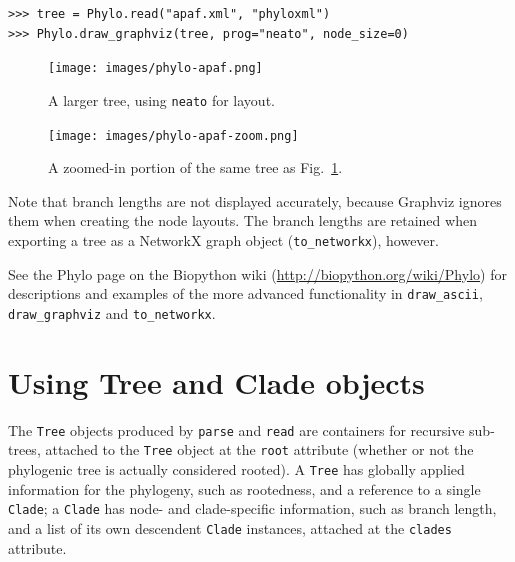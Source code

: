 \documentclass{report}
\begin{document}
\begin{verbatim}
>>> tree = Phylo.read("apaf.xml", "phyloxml")
>>> Phylo.draw_graphviz(tree, prog="neato", node_size=0)
\end{verbatim}

\begin{htmlonly}
\label{fig:phylo-apaf}
\label{fig:phylo-apaf-zoom}
\end{htmlonly}

\begin{latexonly}
  \begin{figure}[tbp]
    \centering
    \texttt{[image: images/phylo-apaf.png]} \\
    \caption{A larger tree, using {\tt neato} for layout.}
    \label{fig:phylo-apaf}
  \end{figure}
  \begin{figure}[btp]
    \centering
    \texttt{[image: images/phylo-apaf-zoom.png]}
    \caption{A zoomed-in portion of the same tree as Fig.~\ref{fig:phylo-apaf}.}
    \label{fig:phylo-apaf-zoom}
  \end{figure}
\end{latexonly}

Note that branch lengths are not displayed accurately, because Graphviz ignores them when
creating the node layouts. The branch lengths are retained when exporting a tree as a NetworkX
graph object (\verb|to_networkx|), however.

See the Phylo page on the Biopython wiki (\url{http://biopython.org/wiki/Phylo}) for
descriptions and examples of the more advanced functionality in \verb|draw_ascii|,
\verb|draw_graphviz| and \verb|to_networkx|.


\section{Using Tree and Clade objects}

The \verb|Tree| objects produced by \verb|parse| and \verb|read| are containers for recursive
sub-trees, attached to the \verb|Tree| object at the \verb|root| attribute (whether or not the
phylogenic tree is actually considered rooted). A \verb|Tree| has globally applied information
for the phylogeny, such as rootedness, and a reference to a single \verb|Clade|; a
\verb|Clade| has node- and clade-specific information, such as branch length, and a list of
its own descendent \verb|Clade| instances, attached at the \verb|clades| attribute.
\end{document}
